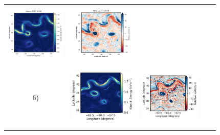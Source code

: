 \begin{bibunit}
\begin{figure}[H]
\begin{center}
\begin{tabular}{ccccc}
\includegraphics[trim={13mm 13mm 22mm 6mm},clip, width=2.9cm,height=2.9cm]{00_Simulearning/figures/plots/enatl60-t_rec_ke.png} &
\includegraphics[trim={13mm 13mm 22mm 6mm},clip,width=2.9cm,height=2.9cm]{00_Simulearning/figures/plots/enatl60-t_rec_vort_r.png} \\
 \hspace{-10mm} 6) &
 \includegraphics[trim={0 0 25mm 5mm},clip, width=3.3cm,height=3.1cm]{00_Simulearning/figures/plots2/enatl60-0_train_ke.png} &
 \includegraphics[trim={18mm 0 26mm 5mm},clip, width=2.9cm,height=3.1cm]{00_Simulearning/figures/plots2/enatl60-0_train_vort_r.png} &

\end{tabular}
\end{center}
\end{figure}
\end{bibunit}
